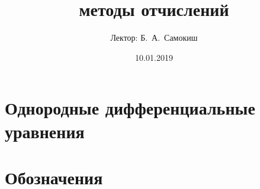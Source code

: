 \documentclass{trlnotes}
\title{методы отчислений}
\date{10.01.2019}
\author{Лектор: Б.~А.~Самокиш}
\begin{document}
 
\maketitle
\tableofcontents
\clearpage

\chapter{Однородные дифференциальные уравнения}


\clearpage

\appendix
\chapter{Обозначения}
% 

\end{document}
